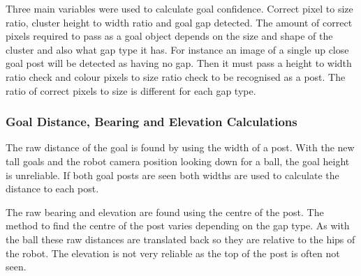 Three main variables were used to calculate goal confidence. Correct pixel to size ratio, cluster height to width ratio and goal gap detected. The amount of correct pixels required to pass as a goal object depends on the size and shape of the cluster and also what gap type it has. For instance an image of a single up close goal post will be detected as having no gap. Then it must pass a height to width ratio check and colour pixels to size ratio check to be recognised as a post. The ratio of correct pixels to size is different for each gap type.
 
\subsubsection{Goal Distance, Bearing and Elevation Calculations}

The raw distance of the goal is found by using the width of a post. With the new tall goals and the robot camera position looking down for a ball, the goal height is unreliable. If both goal posts are seen both widths are used to calculate the distance to each post. 

The raw bearing and elevation are found using the centre of the post. The method to find the centre of the post varies depending on the gap type. As with the ball these raw distances are translated back so they are relative to the hips of the robot. The elevation is not very reliable as the top of the post is often not seen.

%




